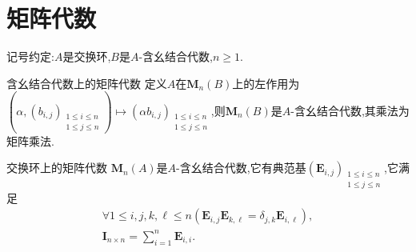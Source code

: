 \section{矩阵代数}

记号约定:$A$是交换环,$B$是$A$-含幺结合代数,$n\geq 1$.

\begin{proposition}{含幺结合代数上的矩阵代数}{}
	定义$A$在$\mathbf{M}_{n}\left(B\right)$上的左作用为$\left(\alpha,\left(b_{i,j}\right)_{\substack{1\leq i\leq n\\ 1\leq j\leq n}}\right)\mapsto\left(\alpha b_{i,j}\right)_{\substack{1\leq i\leq n\\ 1\leq j\leq n}}$,则$\mathbf{M}_{n}\left(B\right)$是$A$-含幺结合代数,其乘法为矩阵乘法.
\end{proposition}

\begin{corollary}{交换环上的矩阵代数}{}
	$\mathbf{M}_{n}\left(A\right)$是$A$-含幺结合代数,它有典范基$\left(\boldsymbol{E}_{i,j}\right)_{\substack{1\leq i\leq n\\ 1\leq j\leq n}}$,它满足
	\begin{gather*}
		\forall 1\leq i,j,k,\ell\leq n\left(\boldsymbol{E}_{i,j}\boldsymbol{E}_{k,\ell}=\delta_{j,k}\boldsymbol{E}_{i,\ell}\right),\\
		\boldsymbol{I}_{n\times n}=\sum\limits_{i=1}^{n}\boldsymbol{E}_{i,i}.
	\end{gather*}
\end{corollary}









